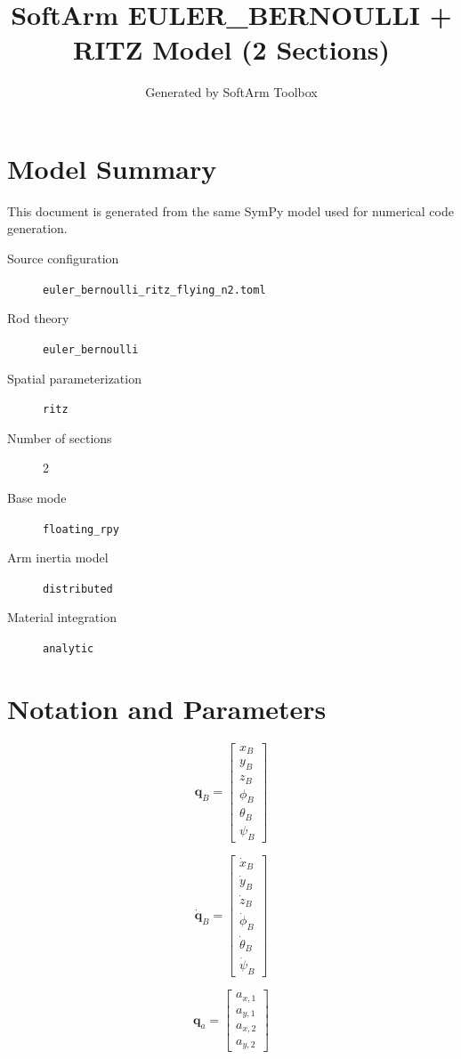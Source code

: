 \documentclass[11pt]{article}
\title{SoftArm EULER\_BERNOULLI + RITZ Model (2 Sections)}
\author{Generated by SoftArm Toolbox}
\date{}
\begin{document}
\maketitle

\section{Model Summary}
This document is generated from the same SymPy model used for numerical code generation.
\begin{description}
\item[Source configuration] \texttt{euler\_bernoulli\_ritz\_flying\_n2.toml}
\item[Rod theory] \texttt{euler\_bernoulli}
\item[Spatial parameterization] \texttt{ritz}
\item[Number of sections] 2
\item[Base mode] \texttt{floating\_rpy}
\item[Arm inertia model] \texttt{distributed}
\item[Material integration] \texttt{analytic}
\end{description}

\section{Notation and Parameters}
\begin{equation}
\boldsymbol q_B=\begin{bmatrix}x_B\\y_B\\z_B\\\phi_B\\\theta_B\\\psi_B\end{bmatrix}
\end{equation}

\begin{equation}
\dot{\boldsymbol q}_B=\begin{bmatrix}\dot{x}_B\\\dot{y}_B\\\dot{z}_B\\\dot{\phi}_B\\\dot{\theta}_B\\\dot{\psi}_B\end{bmatrix}
\end{equation}

\begin{equation}
\boldsymbol q_a=\begin{bmatrix}a_{x,1}\\a_{y,1}\\a_{x,2}\\a_{y,2}\end{bmatrix}
\end{equation}
\end{document}
